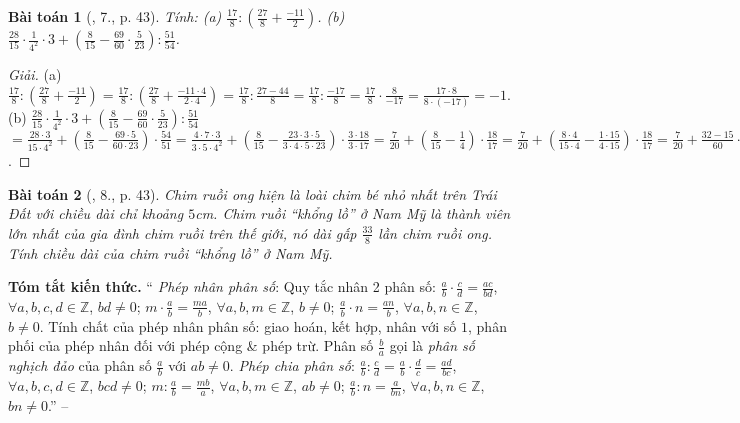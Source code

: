 \documentclass{article}
\newtheorem{baitoan}{Bài toán}
\begin{document}
\begin{baitoan}[\cite{SGK_Toan_6_Canh_Dieu_tap_2}, 7., p. 43]
	Tính: (a) $\frac{17}{8}:\left(\frac{27}{8} + \frac{-11}{2}\right)$. (b) $\frac{28}{15}\cdot\frac{1}{4^2}\cdot3 + \left(\frac{8}{15} - \frac{69}{60}\cdot\frac{5}{23}\right):\frac{51}{54}$.
\end{baitoan}

\begin{proof}[Giải]
	(a) $\frac{17}{8}:\left(\frac{27}{8} + \frac{-11}{2}\right) = \frac{17}{8}:\left(\frac{27}{8} + \frac{-11\cdot4}{2\cdot4}\right) = \frac{17}{8}:\frac{27 - 44}{8} = \frac{17}{8}:\frac{-17}{8} = \frac{17}{8}\cdot\frac{8}{-17} = \frac{17\cdot8}{8\cdot(-17)} = -1$. (b) $\frac{28}{15}\cdot\frac{1}{4^2}\cdot3 + \left(\frac{8}{15} - \frac{69}{60}\cdot\frac{5}{23}\right):\frac{51}{54}$ $= \frac{28\cdot3}{15\cdot4^2} + \left(\frac{8}{15} - \frac{69\cdot5}{60\cdot23}\right)\cdot\frac{54}{51} = \frac{4\cdot7\cdot3}{3\cdot5\cdot4^2} + \left(\frac{8}{15} - \frac{23\cdot3\cdot5}{3\cdot4\cdot5\cdot23}\right)\cdot\frac{3\cdot18}{3\cdot17} = \frac{7}{20} + \left(\frac{8}{15} - \frac{1}{4}\right)\cdot\frac{18}{17} = \frac{7}{20} + \left(\frac{8\cdot4}{15\cdot4} - \frac{1\cdot15}{4\cdot15}\right)\cdot\frac{18}{17} = \frac{7}{20} + \frac{32 - 15}{60}\cdot\frac{18}{17} = \frac{7}{20} + \frac{17}{60}\cdot\frac{18}{17} = \frac{7}{20} + \frac{18}{60} = \frac{7}{20} + \frac{6}{20} = \frac{7 + 6}{20} = \frac{13}{20}$.
\end{proof}

\begin{baitoan}[\cite{SGK_Toan_6_Canh_Dieu_tap_2}, 8., p. 43]
	Chim ruồi ong hiện là loài chim bé nhỏ nhất trên Trái Đất với chiều dài chỉ khoảng $5$\emph{cm}. Chim ruồi ``khổng lồ'' ở Nam Mỹ là thành viên lớn nhất của gia đình chim ruồi trên thế giới, nó dài gấp $\frac{33}{8}$ lần chim ruồi ong. Tính chiều dài của chim ruồi ``khổng lồ'' ở Nam Mỹ.
\end{baitoan}
\noindent\textsf{\textbf{Tóm tắt kiến thức.}} `` \textit{Phép nhân phân số}: Quy tắc nhân 2 phân số: $\frac{a}{b}\cdot\frac{c}{d} = \frac{ac}{bd}$, $\forall a,b,c,d\in\mathbb{Z}$, $bd\ne0$; $m\cdot\frac{a}{b} = \frac{ma}{b}$, $\forall a,b,m\in\mathbb{Z}$, $b\ne0$; $\frac{a}{b}\cdot n = \frac{an}{b}$, $\forall a,b,n\in\mathbb{Z}$, $b\ne0$. Tính chất của phép nhân phân số: giao hoán, kết hợp, nhân với số $1$, phân phối của phép nhân đối với phép cộng \& phép trừ. Phân số $\frac{b}{a}$ gọi là \emph{phân số nghịch đảo} của phân số $\frac{a}{b}$ với $ab\ne0$.  \textit{Phép chia phân số}: $\frac{a}{b}:\frac{c}{d} = \frac{a}{b}\cdot\frac{d}{c} = \frac{ad}{bc}$, $\forall a,b,c,d\in\mathbb{Z}$, $bcd\ne0$; $m:\frac{a}{b} = \frac{mb}{a}$, $\forall a,b,m\in\mathbb{Z}$, $ab\ne0$; $\frac{a}{b}:n = \frac{a}{bn}$, $\forall a,b,n\in\mathbb{Z}$, $bn\ne0$.'' -- \cite[Chap. V, \S4, p. 39]{SBT_Toan_6_Canh_Dieu_tap_2}
\end{document}
